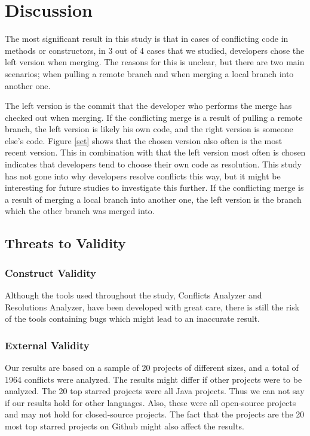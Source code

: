 \section{Discussion}
The most significant result in this study is that in cases of conflicting code in methods or constructors, in 3 out of 4 cases that we studied, developers chose the left version when merging. The reasons for this is unclear, but there are two main scenarios; when pulling a remote branch and when merging a local branch into another one.

The left version is the commit that the developer who performs the merge has checked out when merging. If the conflicting merge is a result of pulling a remote branch, the left version is likely his own code, and the right version is someone else’s code. Figure \ref{set} shows that the chosen version also often is the most recent version. This in combination with that the left version most often is chosen indicates that developers tend to choose their own code as resolution. This study has not gone into why developers resolve conflicts this way, but it might be interesting for future studies to investigate this further. If the conflicting merge is a result of merging a local branch into another one, the left version is the branch which the other branch was merged into.

\subsection{Threats to Validity}
\subsubsection{Construct Validity}
Although the tools used throughout the study, Conflicts Analyzer and Resolutions Analyzer, have been developed with great care, there is still the risk of the tools containing bugs which might lead to an inaccurate result.
\subsubsection{External Validity}
Our results are based on a sample of 20 projects of different sizes, and a total of 1964 conflicts were analyzed. The results might differ if other projects were to be analyzed. The 20 top starred projects were all Java projects. Thus we can not say if our results hold for other languages. Also, these were all open-source projects and may not hold for closed-source projects. The fact that the projects are the 20 most top starred projects on Github might also affect the results.
